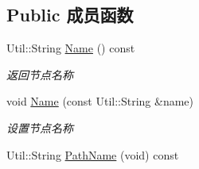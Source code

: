 \subsection*{Public 成员函数}
\begin{DoxyCompactItemize}
\item 
Util\-::\-String \hyperlink{class_file_sys_1_1_node_ac63b1d29e592028c77c70cbad8882834}{Name} () const 
\begin{DoxyCompactList}\small\item\em 返回节点名称 \end{DoxyCompactList}\item 
void \hyperlink{class_file_sys_1_1_node_a1d8a20f46e5036807ab404d04fc5da00}{Name} (const Util\-::\-String \&name)
\begin{DoxyCompactList}\small\item\em 设置节点名称 \end{DoxyCompactList}\item 
\hypertarget{class_file_sys_1_1_node_af1c666766a41b8acfeb7ddb447d22183}{Util\-::\-String \hyperlink{class_file_sys_1_1_node_af1c666766a41b8acfeb7ddb447d22183}{Path\-Name} (void) const }\label{class_file_sys_1_1_node_af1c666766a41b8acfeb7ddb447d22183}


\end{DoxyCompactItemize}
